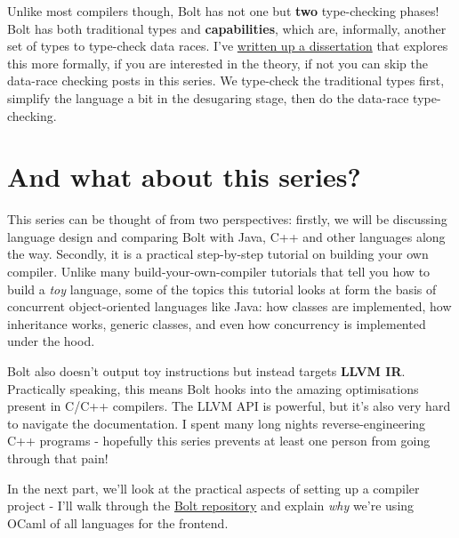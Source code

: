 Unlike most compilers though, Bolt has not one but \textbf{two}
type-checking phases! Bolt has both traditional types and
\textbf{capabilities}, which are, informally, another set of types to
type-check data races. I've
\href{https://github.com/mukul-rathi/bolt-dissertation}{written up a
dissertation} that explores this more formally, if you are interested in
the theory, if not you can skip the data-race checking posts in this
series. We type-check the traditional types first, simplify the language
a bit in the desugaring stage, then do the data-race type-checking.

\hypertarget{and-what-about-this-series}{%
\section{\texorpdfstring{\protect\hyperlink{and-what-about-this-series}{}And
what about this
series?}{And what about this series?}}\label{and-what-about-this-series}}

This series can be thought of from two perspectives: firstly, we will be
discussing language design and comparing Bolt with Java, C++ and other
languages along the way. Secondly, it is a practical step-by-step
tutorial on building your own compiler. Unlike many
build-your-own-compiler tutorials that tell you how to build a
\emph{toy} language, some of the topics this tutorial looks at form the
basis of concurrent object-oriented languages like Java: how classes are
implemented, how inheritance works, generic classes, and even how
concurrency is implemented under the hood.

Bolt also doesn't output toy instructions but instead targets
\textbf{LLVM IR}. Practically speaking, this means Bolt hooks into the
amazing optimisations present in C/C++ compilers. The LLVM API is
powerful, but it's also very hard to navigate the documentation. I spent
many long nights reverse-engineering C++ programs - hopefully this
series prevents at least one person from going through that pain!

In the next part, we'll look at the practical aspects of setting up a
compiler project - I'll walk through the
\href{https://github.com/mukul-rathi/bolt}{Bolt repository} and explain
\emph{why} we're using OCaml of all languages for the frontend.


